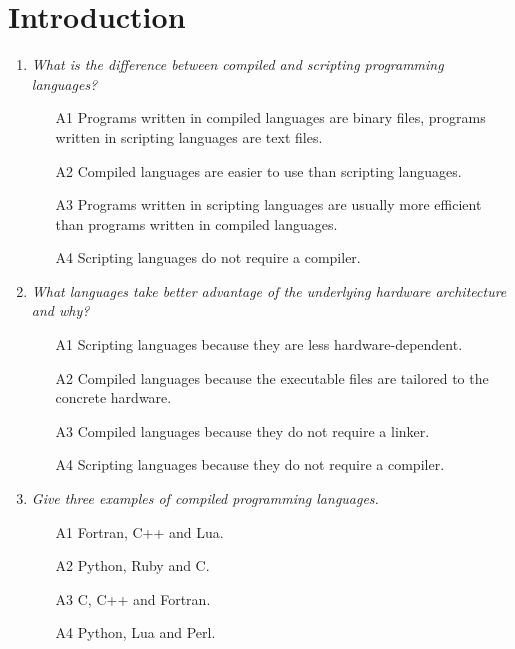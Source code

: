 \setcounter{section}{0}
\section{Introduction}

\begin{enumerate}
\item {\em What is the difference between compiled and scripting programming languages?}\\

\begin{enumerate}
\item[A1] Programs written in compiled languages are binary files, programs written in 
          scripting languages are text files. 
\item[A2] Compiled languages are easier to use than scripting languages.
\item[A3] Programs written in scripting languages are usually more efficient than programs 
          written in compiled languages.
\item[A4] Scripting languages do not require a compiler.
\end{enumerate}
\vspace{4mm}

\item {\em What languages take better advantage of the underlying hardware architecture
      and why?}\\

\begin{enumerate}
\item[A1] Scripting languages because they are less hardware-dependent.
\item[A2] Compiled languages because the executable files are tailored 
          to the concrete hardware.
\item[A3] Compiled languages because they do not require a linker.
\item[A4] Scripting languages because they do not require a compiler.
\end{enumerate}
\vspace{4mm}

\item {\em Give three examples of compiled programming languages.}\\

\begin{enumerate}
\item[A1] Fortran, C++ and Lua.
\item[A2] Python, Ruby and C.
\item[A3] C, C++ and Fortran.
\item[A4] Python, Lua and Perl.
\end{enumerate}
\vspace{4mm}


\end{enumerate}
